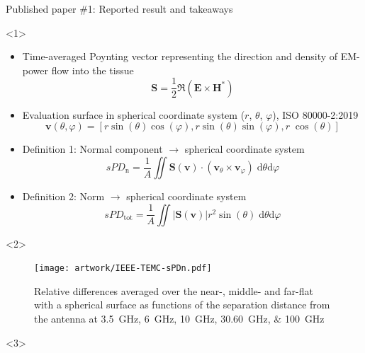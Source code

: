 \documentclass[xcolor=dvipsnames,10pt]{beamer}
\begin{document}
\begin{frame}{Published paper \#1: Reported result and takeaways}
    \begin{onlyenv}<1>
        \begin{itemize}
            \item Time-averaged Poynting vector representing the direction and density of EM-power flow into the tissue
            \begin{equation*}
                \mathbf{S} = \frac{1}{2} \Re \left( \mathbf{E} \times \mathbf{H}^{*} \right)
            \end{equation*}
            \item Evaluation surface in spherical coordinate system ($r$, $\theta$, $\varphi$), ISO 80000-2:2019
            \begin{equation*}
                \mathbf{v}(\theta, \varphi) = \left[r \sin(\theta) \cos(\varphi), r \sin(\theta) \sin(\varphi), r \; \cos(\theta) \right]
            \end{equation*}
            \item Definition 1: Normal component $\rightarrow$ spherical coordinate system
            \begin{equation*}
                sPD_\text{n} = \frac{1}{A} \iint \mathbf{S}(\mathbf{v}) \cdot \left( \mathbf{v}_\theta \times \mathbf{v}_\varphi \right) \; \mathrm{d}\theta \mathrm{d}\varphi
            \end{equation*}
            \item Definition 2: Norm $\rightarrow$ spherical coordinate system
            \begin{equation*}
                sPD_\text{tot} = \frac{1}{A} \iint \lvert \mathbf{S}(\mathbf{v}) \rvert r^2 \sin(\theta) \; \mathrm{d}\theta \mathrm{d}\varphi
            \end{equation*}
        \end{itemize}
    \end{onlyenv}
    \begin{onlyenv}<2>
        \begin{figure}
            \centering
            \texttt{[image: artwork/IEEE-TEMC-sPDn.pdf]}
            \caption{Relative differences averaged over the near-, middle- and far-flat with a spherical surface as functions of the separation distance from the antenna at \SIlist{3.5;6;10;30,60;100}{\GHz}}
        \end{figure}
    \end{onlyenv}
    \begin{onlyenv}<3>

\end{onlyenv}
\end{frame}
\end{document}
